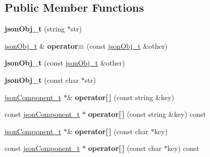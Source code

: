 \subsection*{\-Public \-Member \-Functions}
\begin{DoxyCompactItemize}
\item 
\hypertarget{classjsonObj__t_a70a49fd032d852cbb36288a9390986fb}{{\bfseries json\-Obj\-\_\-t} (string $\ast$str)}\label{classjsonObj__t_a70a49fd032d852cbb36288a9390986fb}

\item 
\hypertarget{classjsonObj__t_a346fb90b201deb36a5df54ade0de61b7}{\hyperlink{classjsonObj__t}{json\-Obj\-\_\-t} \& {\bfseries operator=} (const \hyperlink{classjsonObj__t}{json\-Obj\-\_\-t} \&other)}\label{classjsonObj__t_a346fb90b201deb36a5df54ade0de61b7}

\item 
\hypertarget{classjsonObj__t_a007c5ded8f2726f5c8a864aa3eee0d19}{{\bfseries json\-Obj\-\_\-t} (const \hyperlink{classjsonObj__t}{json\-Obj\-\_\-t} \&other)}\label{classjsonObj__t_a007c5ded8f2726f5c8a864aa3eee0d19}

\item 
\hypertarget{classjsonObj__t_acdf36584591e5682ed272ac55a12911b}{{\bfseries json\-Obj\-\_\-t} (const char $\ast$str)}\label{classjsonObj__t_acdf36584591e5682ed272ac55a12911b}

\item 
\hypertarget{classjsonObj__t_a45c263c7c79f1587c13f9038155daf00}{\hyperlink{classjsonComponent__t}{json\-Component\-\_\-t} $\ast$\& {\bfseries operator\mbox{[}$\,$\mbox{]}} (const string \&key)}\label{classjsonObj__t_a45c263c7c79f1587c13f9038155daf00}

\item 
\hypertarget{classjsonObj__t_abe95d65bfbff71a69e16c7292ec6cb8a}{const \hyperlink{classjsonComponent__t}{json\-Component\-\_\-t} $\ast$ {\bfseries operator\mbox{[}$\,$\mbox{]}} (const string \&key) const }\label{classjsonObj__t_abe95d65bfbff71a69e16c7292ec6cb8a}

\item 
\hypertarget{classjsonObj__t_aa3347389d9712828bfe63afacedbac11}{\hyperlink{classjsonComponent__t}{json\-Component\-\_\-t} $\ast$\& {\bfseries operator\mbox{[}$\,$\mbox{]}} (const char $\ast$key)}\label{classjsonObj__t_aa3347389d9712828bfe63afacedbac11}

\item 
\hypertarget{classjsonObj__t_a395d95f32f469a744fda1d1bd63e646d}{const \hyperlink{classjsonComponent__t}{json\-Component\-\_\-t} $\ast$ {\bfseries operator\mbox{[}$\,$\mbox{]}} (const char $\ast$key) const }\label{classjsonObj__t_a395d95f32f469a744fda1d1bd63e646d}


\end{DoxyCompactItemize}
